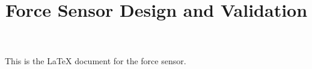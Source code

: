 \documentclass[11pt]{article}
\title{Force Sensor Design and Validation}
\date{\vspace{-5ex}} %
\begin{document}
\maketitle
\onehalfspacing
This is the LaTeX document for the force sensor. 
\end{document}

